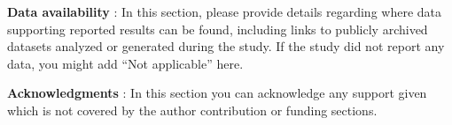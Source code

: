 \documentclass[10pt,twoside,reqno]{amsart} %
\theoremstyle{plain}
\theoremstyle{definition}
\begin{document}
\bigskip
{\bf Data availability} : {In this section, please provide details regarding where data supporting reported results can be found, including links to publicly archived datasets analyzed or generated during the study. If the study did not report any data, you might add ``Not applicable'' here.} 

\bigskip
{\bf Acknowledgments} : {In this section you can acknowledge any support given which is not covered by the author contribution or funding sections.}


\bigskip

\end{document}
